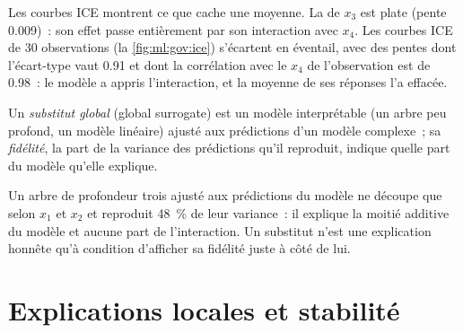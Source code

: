 Les courbes ICE montrent ce que cache une moyenne. La  de $x_3$ est plate (pente 0.009)~: son effet passe entièrement par son
interaction avec $x_4$. Les courbes ICE de 30 observations (la \cref{fig:ml:gov:ice}) s'écartent en éventail, avec des pentes dont l'écart-type
vaut 0.91 et dont la corrélation avec le $x_4$ de l'observation est de 0.98~: le modèle a appris l'interaction, et la
moyenne de ses réponses l'a effacée.

\begin{omfigure}

\label{fig:ml:gov:ice}
\end{omfigure}

\begin{definition}\label{def:ml:interpretability-and-model-governance:surrogate}
Un \emph{substitut global} (global surrogate) est un modèle interprétable (un arbre peu profond, un modèle linéaire) ajusté aux
prédictions d'un modèle complexe~; sa \emph{fidélité}, la part de la variance des prédictions qu'il reproduit, indique quelle part du
modèle qu'elle explique.
\end{definition}

Un arbre de profondeur trois ajusté aux prédictions du modèle ne découpe que selon $x_1$ et $x_2$ et reproduit 48~\% de leur variance~: il
explique la moitié additive du modèle et aucune part de l'interaction. Un substitut n'est une explication honnête qu'à condition
d'afficher sa fidélité juste à côté de lui.

\section{Explications locales et stabilité}

